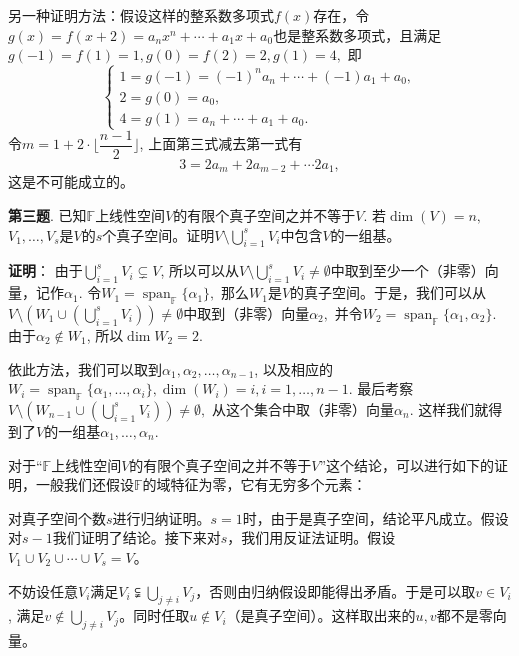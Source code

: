 \vspace{1em}

另一种证明方法：假设这样的整系数多项式$f(x)$存在，令$g(x) = f(x+2) = a_nx^n + \cdots + a_1x + a_0$也是整系数多项式，且满足$g(-1) = f(1) = 1, g(0) = f(2) = 2, g(1) = 4,$ 即
$$\begin{cases}
1 = g(-1) = (-1)^na_n + \cdots + (-1)a_1 + a_0, \\
2 = g(0) = a_0, \\
4 = g(1) = a_n + \cdots + a_1 + a_0.
\end{cases}$$
令$m = 1 + 2 \cdot \lfloor \dfrac{n-1}{2} \rfloor$, 上面第三式减去第一式有
$$3 = 2a_m + 2a_{m-2} + \cdots 2a_1,$$
这是不可能成立的。

\newpageorvspace

{\bf 第三题}. 已知$\mathbb{F}$上线性空间$V$的有限个真子空间之并不等于$V.$ 若$\dim(V) = n,$ $V_1, \ldots, V_s$是$V$的$s$个真子空间。证明$\displaystyle V \setminus \bigcup_{i=1}^s V_i$中包含$V$的一组基。

\newpageorvspace

{\bf 证明}： 由于$\displaystyle \bigcup_{i=1}^s V_i \subsetneq V$, 所以可以从$V \setminus \bigcup_{i=1}^s V_i \neq \emptyset$中取到至少一个（非零）向量，记作$\alpha_1.$ 令$W_1 = \operatorname{span}_{\mathbb{F}}\{\alpha_1\},$ 那么$W_1$是$V$的真子空间。于是，我们可以从$V \setminus \left( W_1 \cup \left( \bigcup_{i=1}^s V_i \right) \right) \neq \emptyset$中取到（非零）向量$\alpha_2,$ 并令$W_2 = \operatorname{span}_{\mathbb{F}}\{\alpha_1, \alpha_2\}$. 由于$\alpha_2 \not\in W_1$, 所以$\dim W_2 = 2$.

依此方法，我们可以取到$\alpha_1, \alpha_2, \ldots, \alpha_{n-1}$, 以及相应的$W_i = \operatorname{span}_{\mathbb{F}}\{\alpha_1, \ldots, \alpha_i\}, \dim (W_i) = i, i=1, \ldots, n-1$. 最后考察$V \setminus \left( W_{n-1} \cup \left( \bigcup_{i=1}^s V_i \right) \right) \neq \emptyset,$ 从这个集合中取（非零）向量$\alpha_n$. 这样我们就得到了$V$的一组基$\alpha_1, \ldots, \alpha_n.$

\vspace{1em}

对于``$\mathbb{F}$上线性空间$V$的有限个真子空间之并不等于$V$''这个结论，可以进行如下的证明，一般我们还假设$\mathbb{F}$的域特征为零，它有无穷多个元素：

对真子空间个数$s$进行归纳证明。$s=1$时，由于是真子空间，结论平凡成立。假设对$s-1$我们证明了结论。接下来对$s$，我们用反证法证明。假设$V_1\cup V_2\cup \cdots \cup V_s = V$。

不妨设任意$V_i$满足$V_i \subsetneqq \bigcup\limits_{j\neq i} V_j$，否则由归纳假设即能得出矛盾。于是可以取$v\in V_i$, 满足$v\not\in \bigcup\limits_{j\neq i} V_j$。同时任取$u\not\in V_i$（是真子空间）。这样取出来的$u,v$都不是零向量。

